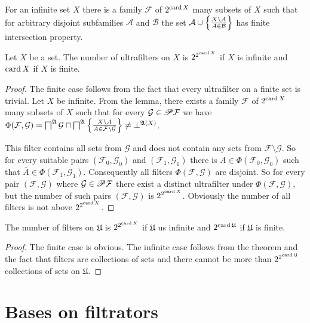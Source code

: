 \begin{cor}
For an infinite set $X$ there is a family $\mathcal{F}$ of $2^{\operatorname{card} X}$
many subsets of $X$ such that for arbitrary disjoint subfamilies
$\mathcal{A}$ and $\mathcal{B}$ the set $\mathcal{A}\cup\left\{ \frac{X\setminus A}{A\in\mathcal{B}}\right\}$
has finite intersection property.\end{cor}
\begin{thm}
Let $X$ be a set. The number of ultrafilters on $X$ is $2^{2^{\operatorname{card} X}}$
if $X$ is infinite and $\operatorname{card} X$ if $X$ is finite.\end{thm}
\begin{proof}
The finite case follows from the fact that every ultrafilter on a
finite set is trivial. Let $X$ be infinite. From the lemma, there
exists a family $\mathcal{F}$ of $2^{\operatorname{card} X}$ many subsets of $X$
such that for every $\mathcal{G}\in\mathscr{P}\mathcal{F}$ we have $\Phi(\mathcal{F},\mathcal{G})=\bigsqcap^{\mathfrak{A}}\mathcal{G}\sqcap\bigsqcap^{\mathfrak{A}}\left\{ \frac{X\setminus A}{A\in\mathcal{F}\setminus\mathcal{G}}\right\}\ne\bot^{\mathfrak{A}(X)}$.

This filter contains all sets from $\mathcal{G}$ and does not contain
any sets from $\mathcal{F}\setminus\mathcal{G}$. So for every suitable
pairs $(\mathcal{F}_{0},\mathcal{G}_{0})$ and $(\mathcal{F}_{1},\mathcal{G}_{1})$
there is $A\in\Phi(\mathcal{F}_{0},\mathcal{G}_{0})$ such that $\overline{A}\in\Phi(\mathcal{F}_{1},\mathcal{G}_{1})$.
Consequently all filters $\Phi(\mathcal{F},\mathcal{G})$ are disjoint.
So for every pair $(\mathcal{F},\mathcal{G})$ where $\mathcal{G}\in\mathscr{P}\mathcal{F}$
there exist a distinct ultrafilter under $\Phi(\mathcal{F},\mathcal{G})$,
but the number of such pairs $(\mathcal{F},\mathcal{G})$ is $2^{2^{\operatorname{card} X}}$.
Obviously the number of all filters is not above $2^{2^{\operatorname{card} X}}$.\end{proof}
\begin{cor}
The number of filters on $\mathfrak{U}$ is $2^{2^{\operatorname{card} X}}$ if
$\mathfrak{U}$ us infinite and $2^{\operatorname{card}\mathfrak{U}}$ if $\mathfrak{U}$
is finite.\end{cor}
\begin{proof}
The finite case is obvious. The infinite case follows from the theorem
and the fact that filters are collections of sets and there cannot
be more than $2^{2^{\operatorname{card}\mathfrak{U}}}$ collections of sets on $\mathfrak{U}$.
\end{proof}

\section{Bases on filtrators}

